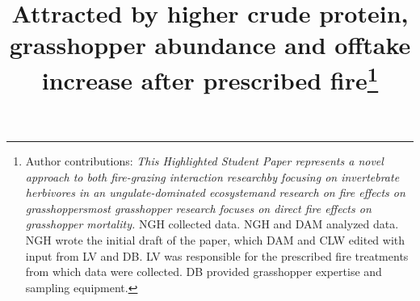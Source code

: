 \documentclass[referee, 
	            sn-basic]
           {sn-jnl}
\begin{document}
\raggedright

\title[Rangeland grasshoppers and prescribed fire]{Attracted by higher crude protein, grasshopper abundance and offtake increase after prescribed fire\footnote{Author contributions:
	\emph{This Highlighted Student Paper represents a novel approach to both fire-grazing interaction research\textemdash by focusing on invertebrate herbivores in an ungulate-dominated ecosystem\textemdash and research on fire effects on grasshoppers\textemdash most grasshopper research focuses on direct fire effects on grasshopper mortality.} 
	NGH collected data. 
	NGH and DAM analyzed data. 
	NGH wrote the initial draft of the paper, which DAM and CLW edited with input from LV and DB.
	LV was responsible for the prescribed fire treatments from which data were collected. 
	DB provided grasshopper expertise and sampling equipment. } }

\author*[1]{  }

\author[2]{ }
\author[3]{ }
\author[2]{ }
\author[3]{ }


            	     
\end{document}
